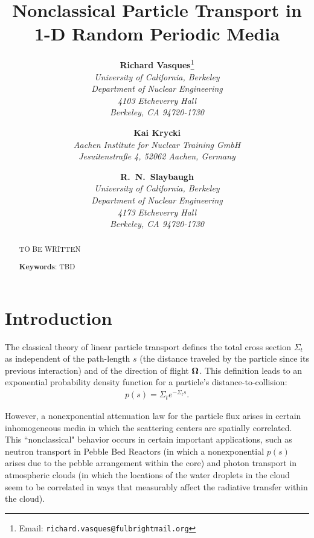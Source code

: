 \documentclass[12pt]{article}
\newcommand{\uomega}{{\bf \Omega}}
\newcommand{\Keywords}[1]{\vspace{12pt}\par\noindent
{\small{\bf Keywords\/}: #1}}
\begin{document}
\title{Nonclassical Particle Transport in 1-D Random Periodic Media}
\author{{\bf Richard Vasques}\footnote{Email: \texttt{richard.vasques@fulbrightmail.org}}\\
\em University of California, Berkeley\\
\em Department of Nuclear Engineering\\
\em 4103 Etcheverry Hall\\
\em Berkeley, CA 94720-1730 \\
\and {\bf Kai Krycki} \\
\em Aachen Institute for Nuclear Training GmbH \\
\em Jesuitenstraße 4, 52062 Aachen, Germany\\
\and {\bf R.\ N.\ Slaybaugh}\\
\em University of California, Berkeley\\
\em Department of Nuclear Engineering\\
\em 4173 Etcheverry Hall\\
\em Berkeley, CA 94720-1730}
\date{}
\maketitle

\begin{abstract}

TO BE WRITTEN

\Keywords{TBD}
\end{abstract}

\pagebreak

\doublespacing

\section{Introduction}

The classical theory of linear particle transport defines the total cross section $\Sigma_t$ as independent of the path-length $s$ (the distance traveled by the particle since its previous interaction) and of the direction of flight $\uomega$.
This definition leads to an exponential probability density function for a particle's distance-to-collision:
\begin{align}\label{eq1}
p(s) = \Sigma_t e^{-\Sigma_t s}.
\end{align}

However, a nonexponential attenuation law for the particle flux arises in certain inhomogeneous media in which the scattering centers are spatially correlated.
This ``nonclassical" behavior occurs in certain important applications, such as neutron transport in Pebble Bed Reactors (in which a nonexponential $p(s)$ arises due to the pebble arrangement within the core) and photon transport in atmospheric clouds (in which the locations of the water droplets in the cloud seem to be correlated in ways that measurably affect the radiative transfer within the cloud).
\end{document}
